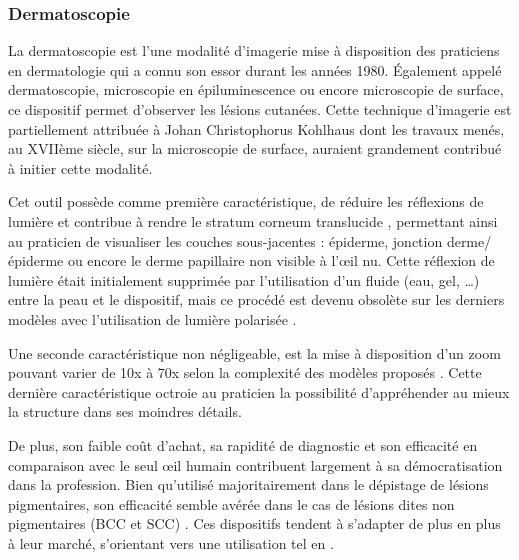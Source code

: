 \subsubsection{Dermatoscopie}
La dermatoscopie est l'une modalité d’imagerie mise à disposition des praticiens en dermatologie qui a connu son essor durant les années 1980. Également appelé dermatoscopie, microscopie en épiluminescence ou encore microscopie de surface, ce dispositif permet d’observer les lésions cutanées. Cette technique d’imagerie est partiellement attribuée à Johan Christophorus Kohlhaus dont les travaux menés, au XVIIème siècle, sur la microscopie de surface, auraient grandement contribué à initier cette modalité.\par
Cet outil possède comme première caractéristique, de réduire les réflexions de lumière et contribue à rendre le stratum corneum translucide \cite{Katz2001}, permettant ainsi au praticien de visualiser les couches sous-jacentes : épiderme, jonction derme/épiderme ou encore le derme papillaire non visible à l’œil nu. Cette réflexion de lumière était initialement supprimée par l’utilisation d’un fluide (eau, gel, …) entre la peau et le dispositif, mais ce procédé est devenu obsolète sur les derniers modèles avec l’utilisation de lumière  polarisée \cite{Campos-do-Carmo2008}.\par
Une seconde caractéristique non négligeable, est la mise à disposition d’un zoom pouvant varier de 10x à 70x selon la complexité des modèles proposés \cite{Campos-do-Carmo2008}. Cette dernière caractéristique octroie au praticien la possibilité d’appréhender au mieux la structure dans ses moindres détails.\par
De plus, son faible coût d’achat, sa rapidité de diagnostic et son efficacité en comparaison avec le seul œil humain \cite{Lallas2013} contribuent largement  à sa démocratisation dans la profession. Bien qu’utilisé majoritairement dans le dépistage de lésions pigmentaires, son efficacité semble avérée dans le cas de lésions dites non pigmentaires (BCC et SCC) \cite{Lallas2013}. Ces dispositifs tendent à s'adapter de plus en plus à leur marché, s'orientant vers une utilisation tel en .\par

